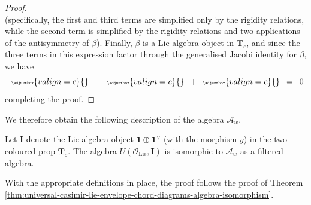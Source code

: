 \begin{proof}
\[{		}
		\mspace{9mu}
	\]
	(specifically, the first and third terms are simplified only by the rigidity relations, while the second term is simplified by the rigidity relations and two applications of the antisymmetry of \(\beta\)). Finally, \(\beta\) is a Lie algebra object in \(\mathbf{T}_{\varepsilon}\), and since the three terms in this expression factor through the generalised Jacobi identity for \(\beta\), we have
	\[
		\mspace{9mu}
		{\tiny
		\def\svgscale{0.30}
		\adjustbox{valign=c}{}
		}
		\mspace{9mu}
		+
		\mspace{9mu}
		{\tiny
		\def\svgscale{0.30}
		\adjustbox{valign=c}{}
		}
		\mspace{9mu}
		+
		\mspace{9mu}
		{\tiny
		\def\svgscale{0.30}
		\adjustbox{valign=c}{}
		}
		\mspace{9mu}
		=
		\mspace{9mu}
		0
	\]
	completing the proof.
\end{proof}

We therefore obtain the following description of the algebra \(\mathcal{A}_{w}\).

\begin{theorem}
	\label{thm:universal-two-coloured-coeval-envelope-arrow-diagrams-isomorphism}
	Let \(\mathbf{I}\) denote the Lie algebra object \(\mathbf{1} \oplus \mathbf{1}^{\vee}\) (with the morphism \(y\)) in the two-coloured prop \(\mathbf{T}_{\varepsilon}\). The algebra \(U(\mathcal{O}_{\text{Lie}}, \mathbf{I})\) is isomorphic to \(\mathcal{A}_{w}\) as a filtered algebra.
\end{theorem}

With the appropriate definitions in place, the proof follows the proof of Theorem \ref{thm:universal-casimir-lie-envelope-chord-diagrams-algebra-isomorphism}.

